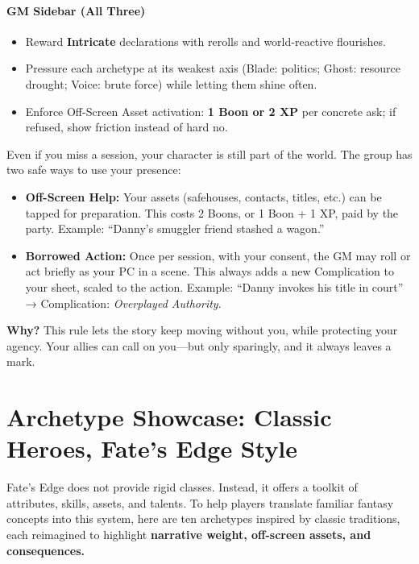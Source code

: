 \documentclass[11pt]{article}
\begin{document}
\paragraph{GM Sidebar (All Three)}
\begin{itemize}
  \item Reward \textbf{Intricate} declarations with rerolls and world-reactive flourishes.
  \item Pressure each archetype at its weakest axis (Blade: politics; Ghost: resource drought; Voice: brute force) while letting them shine often.
  \item Enforce Off-Screen Asset activation: \textbf{1 Boon or 2 XP} per concrete ask; if refused, show friction instead of hard no.
\end{itemize}
\begin{tcolorbox}[colback=gray!10!white,colframe=black,title=Absent PCs]
  Even if you miss a session, your character is still part of the world.  
  The group has two safe ways to use your presence:  
  
  \begin{itemize}
    \item \textbf{Off-Screen Help:} Your assets (safehouses, contacts, titles, etc.) can be tapped for preparation. This costs 2 Boons, or 1 Boon + 1 XP, paid by the party. Example: “Danny’s smuggler friend stashed a wagon.”  
    \item \textbf{Borrowed Action:} Once per session, with your consent, the GM may roll or act briefly as your PC in a scene. This always adds a new Complication to your sheet, scaled to the action. Example: “Danny invokes his title in court” → Complication: \emph{Overplayed Authority}.  
  \end{itemize}
  
  \textbf{Why?} This rule lets the story keep moving without you, while protecting your agency.  
  Your allies can call on you—but only sparingly, and it always leaves a mark.  
  \end{tcolorbox}

  \section{Archetype Showcase: Classic Heroes, Fate's Edge Style}

\noindent
Fate’s Edge does not provide rigid classes. Instead, it offers a toolkit of
attributes, skills, assets, and talents. To help players translate familiar
fantasy concepts into this system, here are ten archetypes inspired by
classic traditions, each reimagined to highlight \textbf{narrative weight,
off-screen assets, and consequences.}
\end{document}
